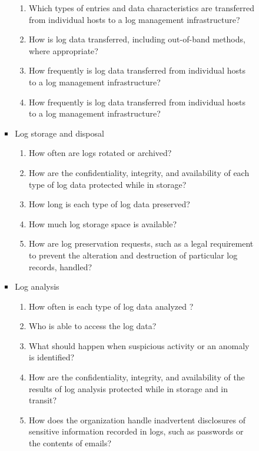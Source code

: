 \documentclass{article}
\begin{document}
\begin{itemize}
\begin{itemize}
\begin{itemize}
\begin{itemize}
\begin{enumerate}
                    \item Which types of entries and data characteristics are transferred from individual hosts to a log management infrastructure?
                    \item How is log data transferred, including out-of-band methods, where appropriate?
                    \item How frequently is log data transferred from individual hosts to a log management infrastructure?
                    \item How frequently is log data transferred from individual hosts to a log management infrastructure?
                \end{enumerate}
                \item Log storage and disposal
                \begin{enumerate}
                    \item How often are logs rotated or archived?
                    \item How are the confidentiality, integrity, and availability of each type of log data protected while in storage?
                    \item How long is each type of log data preserved?
                    \item How much log storage space is available?
                    \item How are log preservation requests, such as a legal requirement to prevent the alteration and destruction of particular log records, handled?
                \end{enumerate}
                \item Log analysis
                \begin{enumerate}
                    \item How often is each type of log data analyzed ?
                    \item Who is able to access the log data?
                    \item What should happen when suspicious activity or an anomaly is identified?
                    \item How are the confidentiality, integrity, and availability of the results of log analysis protected while in storage and in transit?
                    \item How does the organization handle inadvertent disclosures of sensitive information recorded in logs, such as passwords or the contents of emails? 
                \end{enumerate}

\end{itemize}
\end{itemize}
\end{itemize}
\end{itemize}
\end{document}
